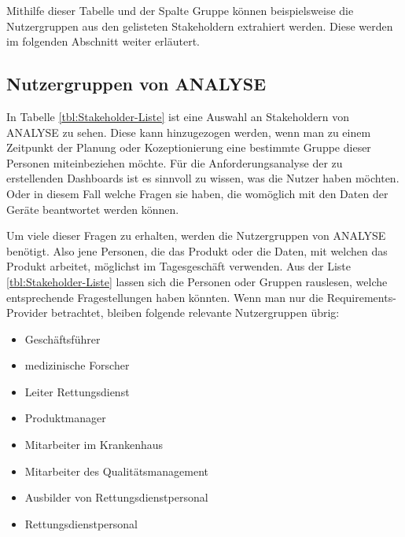 Mithilfe dieser Tabelle und der Spalte \glqq Gruppe\grqq{} können beispielsweise die Nutzergruppen aus den gelisteten Stakeholdern extrahiert werden.
Diese werden im folgenden Abschnitt weiter erläutert.

\subsection{Nutzergruppen von \acrlong*{ANALYSE}}
\label{sub:NutzergruppenAnalyse}
In Tabelle \ref{tbl:Stakeholder-Liste} ist eine Auswahl an Stakeholdern von \gls{ANALYSE} zu sehen.
Diese kann hinzugezogen werden, wenn man zu einem Zeitpunkt der Planung oder Kozeptionierung eine bestimmte Gruppe dieser Personen miteinbeziehen möchte.
Für die Anforderungsanalyse der zu erstellenden \gls{Dashboard}s ist es sinnvoll zu wissen, was die Nutzer haben möchten.
Oder in diesem Fall welche Fragen sie haben, die womöglich mit den Daten der Geräte beantwortet werden können.

Um viele dieser Fragen zu erhalten, werden die Nutzergruppen von \gls{ANALYSE} benötigt.
Also jene Personen, die das Produkt oder die Daten, mit welchen das Produkt arbeitet, möglichst im Tagesgeschäft verwenden.
Aus der Liste \ref{tbl:Stakeholder-Liste} lassen sich die Personen oder Gruppen rauslesen, welche entsprechende Fragestellungen haben könnten. 
Wenn man nur die Requirements-Provider betrachtet, bleiben folgende relevante Nutzergruppen übrig:
\begin{multicols}{2}
\begin{itemize}
\item Geschäftsführer
\item medizinische Forscher
\item Leiter Rettungsdienst
\item Produktmanager
\item Mitarbeiter im Krankenhaus
\item Mitarbeiter des Qualitätsmanagement
\item Ausbilder von Rettungsdienstpersonal
\item Rettungsdienstpersonal
\end{itemize}
\end{multicols}

